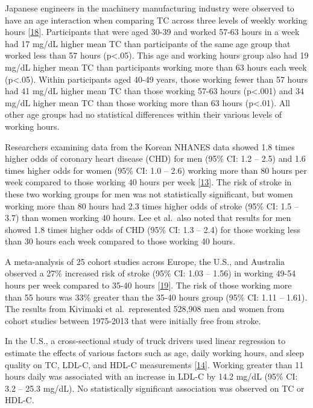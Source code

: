 \documentclass[]{elsarticle} %
\begin{document}
Japanese engineers in the machinery manufacturing industry were observed
to have an age interaction when comparing TC across three levels of
weekly working hours {[}\protect\hyperlink{ref-sasaki1999}{18}{]}.
Participants that were aged 30-39 and worked 57-63 hours in a week had
17 mg/dL higher mean TC than participants of the same age group that
worked less than 57 hours (p\textless.05). This age and working hours
group also had 19 mg/dL higher mean TC than participants working more
than 63 hours each week (p\textless.05). Within participants aged 40-49
years, those working fewer than 57 hours had 41 mg/dL higher mean TC
than those working 57-63 hours (p\textless.001) and 34 mg/dL higher mean
TC than those working more than 63 hours (p\textless.01). All other age
groups had no statistical differences within their various levels of
working hours.

Researchers examining data from the Korean NHANES data showed 1.8 times
higher odds of coronary heart disease (CHD) for men (95\% CI: 1.2 --
2.5) and 1.6 times higher odds for women (95\% CI: 1.0 -- 2.6) working
more than 80 hours per week compared to those working 40 hours per week
{[}\protect\hyperlink{ref-lee2016}{13}{]}. The risk of stroke in these
two working groups for men was not statistically significant, but women
working more than 80 hours had 2.3 times higher odds of stroke (95\% CI:
1.5 -- 3.7) than women working 40 hours. Lee et al.~also noted that
results for men showed 1.8 times higher odds of CHD (95\% CI: 1.3 --
2.4) for those working less than 30 hours each week compared to those
working 40 hours.

A meta-analysis of 25 cohort studies across Europe, the U.S., and
Australia observed a 27\% increased risk of stroke (95\% CI: 1.03 --
1.56) in working 49-54 hours per week compared to 35-40 hours
{[}\protect\hyperlink{ref-kivimaki2015}{19}{]}. The risk of those
working more than 55 hours was 33\% greater than the 35-40 hours group
(95\% CI: 1.11 -- 1.61). The results from Kivimaki et al.~represented
528,908 men and women from cohort studies between 1975-2013 that were
initially free from stroke.

In the U.S., a cross-sectional study of truck drivers used linear
regression to estimate the effects of various factors such as age, daily
working hours, and sleep quality on TC, LDL-C, and HDL-C measurements
{[}\protect\hyperlink{ref-lemke2017}{14}{]}. Working greater than 11
hours daily was associated with an increase in LDL-C by 14.2 mg/dL (95\%
CI: 3.2 -- 25.3 mg/dL). No statistically significant association was
observed on TC or HDL-C.
\end{document}
